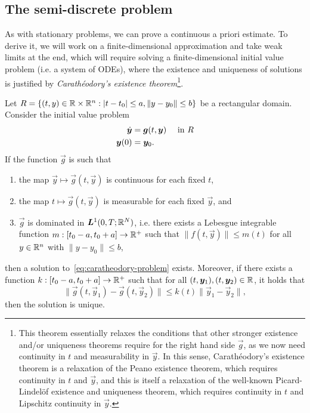 \subsection{The semi-discrete problem}
As with stationary problems, we can prove a continuous a priori estimate. To derive it, we will work on a finite-dimensional approximation and take weak limits at the end, which will require solving a finite-dimensional initial value problem (i.e. a system of ODEs), where the existence and uniqueness of solutions is justified by \emph{Carathéodory's existence theorem}\footnote{This theorem essentially relaxes the conditions that other stronger existence and/or uniqueness theorems require for the right hand side $\vec g$, as we now need continuity in $t$ and measurability in $\vec y$. In this sense, Carathéodory's existence theorem is a relaxation of the Peano existence theorem, which requires continuity in $t$ and $\vec y$, and this is itself a relaxation of the well-known Picard-Lindelöf existence and uniqueness theorem, which requires continuity in $t$ and Lipschitz continuity in $\vec y$.}. 
\begin{theorem}\label{thm:caratheodory-existence}
    Let $R = \{(t,y)\in \mathbb{R}\times \mathbb{R}^n: |t-t_0|\leq a, \|y-y_0\|\leq b\}$ be a rectangular domain. Consider the initial value problem
    \begin{equation}\label{eq:caratheodory-problem}
        \begin{aligned}
            \dot{\vec y} &= \vec g(t, \vec y) &&\tin R\\
            \vec y(0) &= \vec y_0.
        \end{aligned}
    \end{equation}
    If the function $\vec g$ is such that 
    \begin{enumerate}
        \item the map $\vec y \mapsto \vec g(t, \vec y)$ is continuous for each fixed $t$, 
        \item the map $t\mapsto \vec g(t, \vec y)$ is measurable for each fixed $\vec y$, and 
        \item $\vec g$ is dominated in $\vec L^1(0,T;\R^N)$, i.e. there exists a Lebesgue integrable function $m:[t_0-a,t_0+a]\to\mathbb{R}^+$ such that $\|f(t, \vec y)\|\leq m(t)$ for all $y\in\mathbb{R}^n$ with $\|y-y_0\|\leq b$,
    \end{enumerate}
    then a solution to~\ref{eq:caratheodory-problem} exists. Moreover, if there exists a function $k:[t_0-a,t_0+a]\to \mathbb{R}^+$ such that for all $(t,\vec y_1),(t,\vec y_2)\in\R$, it holds that 
    \begin{equation*}
        \|\vec g(t, \vec y_1) - \vec g(t,\vec y_2)\| \leq k(t)\|\vec y_1-\vec y_2\|,
    \end{equation*}
    then the solution is unique.
\end{theorem}
